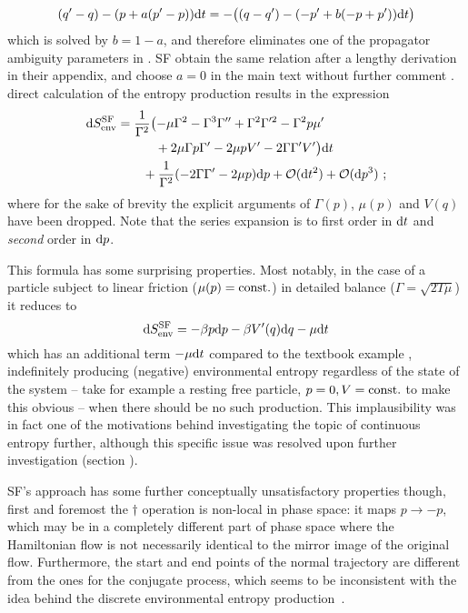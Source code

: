 %
\begin{equation}
	(q'-q)-(p+a(p'-p))\mathrm{d} t = -\bigl((q-q') - (-p'+b(-p+p'))\mathrm{d} t\bigr)
\end{equation}
%
which is solved by \(b = 1 - a\), and therefore eliminates one of the propagator ambiguity parameters in . SF obtain the same relation after a lengthy derivation in their appendix, and choose \(a = 0\) in the main text without further comment . direct calculation of the entropy production results in the expression 
%
\begin{equation}\begin{split}
	\label{eqn:sf entropy production}
	\mathrm{d}S_\text{env}^{\text{SF}}
	&=\frac1{\Gamma^2}\bigl(
		- \mu\Gamma^2
		- \Gamma^3\Gamma''
		+ \Gamma^2\Gamma'^2
		- \Gamma^2p\mu'
	\\&\qquad\quad
		+ 2\mu\Gamma p\Gamma'
		- 2\mu pV'
		- 2 \Gamma\Gamma'V'
		\bigr) \mathrm{d} t
	\\&\qquad
		+\frac1{\Gamma^2}
		(-2\Gamma\Gamma' - 2\mu p) \mathrm{d} p
		+ \mathcal{O}(\mathrm{d} t^2) +  \mathcal{O}(\mathrm{d} p^3) ~;
\end{split}\end{equation}
%
where for the sake of brevity the explicit arguments of \(\Gamma(p)\), \(\mu(p)\) and \(V(q)\) have been dropped.
Note that the series expansion is to first order in \(\mathrm{d} t\) and \emph{second} order in \(\mathrm{d} p\).

This formula has some surprising properties. Most notably, in the case of a particle subject to linear friction (\(\mu(p) = \mathrm{const.}\)) in detailed balance (\(\Gamma = \sqrt{2T\mu}\)) it reduces to
%
\begin{equation}
	\mathrm{d}S_\text{env}^{\text{SF}} = -\beta p \mathrm{d} p - \beta V'(q) \mathrm{d} q - \mu \mathrm{d} t
\end{equation}
%
which has an additional term \(- \mu \mathrm{d} t\) compared to the textbook example , indefinitely producing (negative) environmental entropy regardless of the state of the system -- take for example a resting free particle, \(p=0,V=\mathrm{const.}\) to make this obvious -- when there should be no such production. This implausibility was in fact one of the motivations behind investigating the topic of continuous entropy further, although this specific issue was resolved upon further investigation (section ).

SF's approach has some further conceptually unsatisfactory properties though, first and foremost the \(\dagger\) operation is non-local in phase space: it maps \(p\to-p\), which may be in a completely different part of phase space where the Hamiltonian flow is not necessarily identical to the mirror image of the original flow. Furthermore, the start and end points of the normal trajectory are different from the ones for the conjugate process, which seems to be inconsistent with the idea behind the discrete environmental entropy production~.

